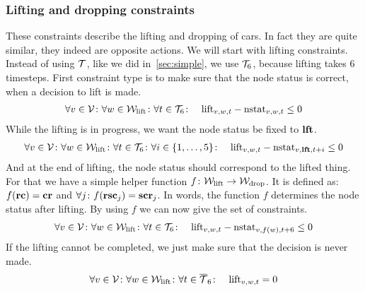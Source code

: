 \subsubsection{Lifting and dropping constraints}
These constraints describe the lifting and dropping of cars. In fact they are
quite similar, they indeed are opposite actions. We will start with lifting
constraints. Instead of using $\mathcal{T}$, like we did in~\autoref{sec:simple}, we use
$\mathcal{T}_6$, because lifting takes 6 timesteps. First constraint type is to make sure
that the node status is correct, when a decision to lift is made.
\begin{align}
    &\forall v \in \mathcal{V} \colon \forall w \in \mathcal{W}_\mathrm{lift} \colon \forall t \in \mathcal{T}_6 \colon
    &\mathrm{lift}_{v,w,t} - \mathrm{nstat}_{v,w,t} \leq 0
\end{align}
While the lifting is in progress, we want the node status be fixed to
$\text{\bf lft}$.
\begin{align}
    &\forall v \in \mathcal{V} \colon \forall w \in \mathcal{W}_\mathrm{lift} \colon \forall t \in \mathcal{T}_6 \colon
    \forall i \in \{1,\ldots,5\} \colon &\mathrm{lift}_{v,w,t} -
    \mathrm{nstat}_{v,\text{\bf lft},t+i} \leq 0
\end{align}
And at the end of lifting, the node status should correspond to the lifted
thing. For that we have a simple helper function $f \colon \mathcal{W}_\mathrm{lift} \to \mathcal{W}_\mathrm{drop}$. It is
defined as: $f(\text{\bf rc}) = \text{\bf cr}$ and $\forall j \colon
f(\text{\bf rsc}_j) = \text{\bf scr}_j$. In words, the function $f$ determines the node
status after lifting. By using $f$ we can now give the set of constraints.
\begin{align}
    &\forall v \in \mathcal{V} \colon \forall w \in \mathcal{W}_\mathrm{lift} \colon \forall t \in \mathcal{T}_6 \colon
    &\mathrm{lift}_{v,w,t} - \mathrm{nstat}_{v,f(w),t+6} \leq 0
\end{align}
If the lifting cannot be completed, we just make sure that the decision is
never made.
\begin{align}
    &\forall v \in \mathcal{V} \colon \forall w \in \mathcal{W}_\mathrm{lift} \colon \forall t \in \overline{\mathcal{T}}_6
    \colon &\mathrm{lift}_{v,w,t} = 0
\end{align}

